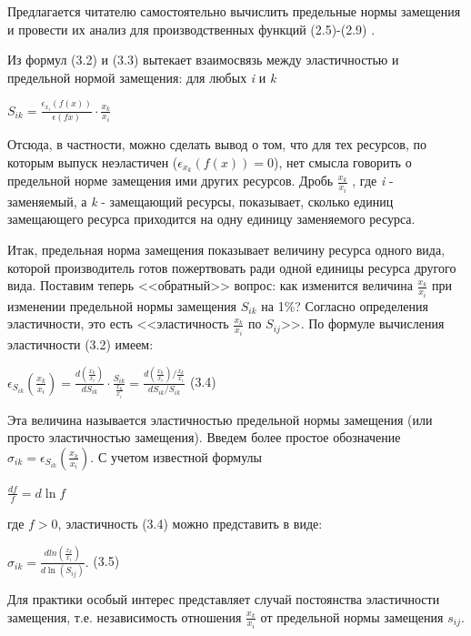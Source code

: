 \documentclass[12pt, 4paper]{book}
\begin{document}
{Предлагается читателю самостоятельно вычислить предельные нормы замещения и провести их анализ для производственных функций (2.5)-(2.9) . 
\par

Из формул (3.2) и (3.3) вытекает взаимосвязь между эластичностью и предельной нормой замещения: для любых \textit{i} и \textit{k}
\begin{center}
$S_{ik}=\frac{\epsilon_{x_i}(f(x))}{\epsilon(f{x})}\cdot \frac{x_k}{x_i}$
\end{center}
\par

Отсюда, в частности, можно сделать вывод о том, что для тех ресурсов, по которым выпуск неэластичен ($\epsilon_{x_k}(f(x))=0$), нет смысла говорить о предельной норме замещения ими других ресурсов. Дробь $\frac{x_k}{x_i}$ , где \textit{i} - заменяемый, а \textit{k} - замещающий ресурсы, показывает, сколько единиц замещающего ресурса приходится на одну единицу заменяемого ресурса. 
\par

Итак, предельная норма замещения показывает величину ресурса одного вида, которой производитель готов пожертвовать ради одной единицы ресурса другого вида. Поставим теперь <<обратный>> вопрос: как изменится величина $\frac{x_k}{x_i}$ при изменении предельной нормы замещения $S_{ik}$ на 1\%? Согласно определения эластичности, это есть <<эластичность $\frac{x_k}{x_i}$  по $S_{ij}$>>. По формуле вычисления эластичности (3.2) имеем: 
\begin{center}
$\epsilon_{S_{ik}}(\frac{x_k}{x_i})=\frac{d(\frac{x_k}{x_i})}{d S_{ik}}\cdot \frac{S_{ik}}{\frac{x_k}{x_i}}=\frac{d(\frac{x_k}{x_i})/\frac{x_k}{x_i}}{d S_{ik}/S_{ik}}$ (3.4)
\end{center}
\par

Эта величина называется эластичностью предельной нормы замещения (или просто эластичностью замещения). Введем более простое обозначение $\sigma_{ik}=\epsilon_{S_{ik}}(\frac{x_k}{x_i})$. С учетом известной формулы 
\begin{center}
$\frac{df}{f}=d\ln f $
\end{center}
где $f>0$, эластичность (3.4) можно представить в виде:
\begin{center}
$\sigma_{ik}=\frac{d ln(\frac{x_k}{x_i})}{d \ln(S_{ij})}.$ (3.5)
\end{center}
Для практики особый интерес представляет случай постоянства эластичности замещения, т.е. независимость отношения $\frac{x_k}{x_i}$ от предельной нормы замещения $s_{ij}$.  
\par

}
\end{document}
